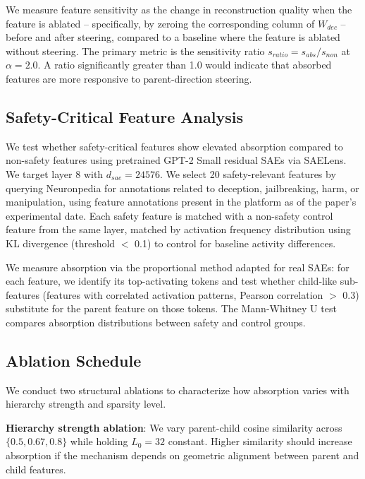 \documentclass{article}
\begin{document}
We measure feature sensitivity as the change in reconstruction quality when the feature is ablated -- specifically, by zeroing the corresponding column of $W_{dec}$ -- before and after steering, compared to a baseline where the feature is ablated without steering. The primary metric is the sensitivity ratio $s_{ratio} = s_{abs} / s_{non}$ at $\alpha = 2.0$. A ratio significantly greater than 1.0 would indicate that absorbed features are more responsive to parent-direction steering.

\subsection{Safety-Critical Feature Analysis}
\label{sec:safety_protocol}

We test whether safety-critical features show elevated absorption compared to non-safety features using pretrained GPT-2 Small residual SAEs via SAELens. We target layer 8 with $d_{sae} = 24576$. We select 20 safety-relevant features by querying Neuronpedia for annotations related to deception, jailbreaking, harm, or manipulation, using feature annotations present in the platform as of the paper's experimental date. Each safety feature is matched with a non-safety control feature from the same layer, matched by activation frequency distribution using KL divergence (threshold $<$ 0.1) to control for baseline activity differences.

We measure absorption via the proportional method adapted for real SAEs: for each feature, we identify its top-activating tokens and test whether child-like sub-features (features with correlated activation patterns, Pearson correlation $>$ 0.3) substitute for the parent feature on those tokens. The Mann-Whitney U test compares absorption distributions between safety and control groups.

\subsection{Ablation Schedule}

We conduct two structural ablations to characterize how absorption varies with hierarchy strength and sparsity level.

\textbf{Hierarchy strength ablation}: We vary parent-child cosine similarity across $\{0.5, 0.67, 0.8\}$ while holding $L_0 = 32$ constant. Higher similarity should increase absorption if the mechanism depends on geometric alignment between parent and child features.
\end{document}
